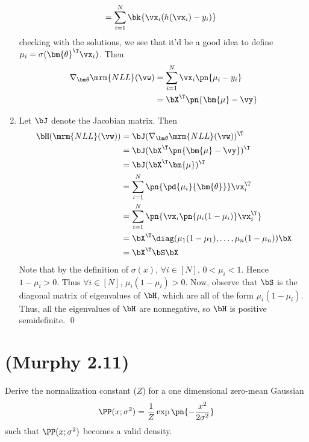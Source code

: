 \documentclass[189]{pset}
\begin{document}
\begin{enumerate}
\begin{align*}
        &= \sum_{i=1}^N \bk{\vx_i (h(\vx_i) - y_i)}
      \end{align*}
      checking with the solutions, we see that it'd be a good idea to
      define $\mu_i = \sigma(\bm{\theta}^\T \vx_i)$. Then
      \begin{align*}
        \nabla_{\bm \theta} \mrm{NLL}(\vw)
        &= \sum_{i=1}^N \vx_i \pn{\mu_i - y_i} \\
        &= \bX^\T \pn{\bm{\mu} - \vy}
      \end{align*}
    \item Let $\bJ$ denote the Jacobian matrix. Then
      \begin{align*}
        \bH(\mrm{NLL}(\vw))
        &= \bJ(\nabla_{\bm \theta} \mrm{NLL}(\vw))^\T \\
        &= \bJ(\bX^\T\pn{\bm{\mu} - \vy})^\T \\
        &= \bJ(\bX^\T \bm{\mu})^\T \\
        &= \sum_{i=1}^N \pn{\pd{\mu_i}{\bm{\theta}}} \vx_i^\T \\
        &= \sum_{i=1}^N \pn{\vx_i \pn{\mu_i(1-\mu_i)} \vx_i^\T} \\
        &= \bX^\T \diag(\mu_1(1-\mu_1), \ldots, \mu_n(1-\mu_n)) \bX \\
        &= \bX^\T \bS \bX
      \end{align*}
      Note that by the definition of $\sigma(x)$, $\forall i \in [N]$,
      $0 < \mu_i < 1$. Hence $1-\mu_i > 0$. Thus $\forall i \in [N]$,
      $\mu_i (1-\mu_i) > 0$. Now, observe that $\bS$ is the diagonal
      matrix of eigenvalues of $\bH$, which are all of the form
      $\mu_i(1-\mu_i)$. Thus, all the eigenvalues of $\bH$ are
      nonnegative, so $\bH$ is positive semidefinite. \qed
  \end{enumerate}


  \clearpage


  \section{(Murphy 2.11)}
    Derive the normalization constant ($Z$) for a one dimensional
    zero-mean Gaussian
    \[
      \PP(x; \sigma^2) = \frac{1}{Z}\exp\pn{-\frac{x^2}{2\sigma^2}}
    \]
    such that $\PP(x; \sigma^2)$ becomes a valid density.

  \hrulefill
\end{document}
